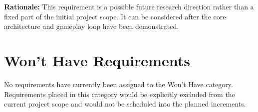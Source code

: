 \documentclass[12pt,a4paper]{article}
\begin{document}
\par\medskip
\textbf{Rationale:} This requirement is a possible future research direction
rather than a fixed part of the initial project scope. It can be considered
after the core architecture and gameplay loop have been demonstrated.

\section{Won't Have Requirements}
\label{sec:wont-have}

No requirements have currently been assigned to the Won't Have category.
Requirements placed in this category would be explicitly excluded from the
current project scope and would not be scheduled into the planned increments.
\end{document}
